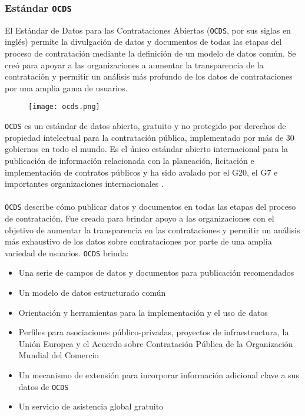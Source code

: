         \subsubsection{Estándar \texttt{OCDS}}
            El Estándar de Datos para las Contrataciones Abiertas (\texttt{OCDS}, por sus siglas en inglés) permite la divulgación de datos y documentos de todas las etapas del proceso de contratación mediante la definición de un modelo de datos común. Se creó para apoyar a las organizaciones a aumentar la transparencia de la contratación y permitir un análisis más profundo de los datos de contrataciones por una amplia gama de usuarios.
        
            \begin{figure}[h]
                \centering
                \texttt{[image: ocds.png]}
            \end{figure}
            
            \noindent \texttt{OCDS} es un estándar de datos abierto, gratuito y no protegido por derechos de propiedad intelectual para la contratación pública, implementado por más de 30 gobiernos en todo el mundo. Es el único estándar abierto internacional para la publicación de información relacionada con la planeación, licitación e implementación de contratos públicos y ha sido avalado por el G20, el G7 e importantes organizaciones internacionales \cite{OCDS}.
            \\ \\
            \texttt{OCDS} describe cómo publicar datos y documentos en todas las etapas del proceso de contratación. Fue creado para brindar apoyo a las organizaciones con el objetivo de aumentar la transparencia en las contrataciones y permitir un análisis más exhaustivo de los datos sobre contrataciones por parte de una amplia variedad de usuarios. \texttt{OCDS} brinda:
            
            \begin{itemize}
                \item Una serie de campos de datos y documentos para publicación recomendados
                \item Un modelo de datos estructurado común
                \item Orientación y herramientas para la implementación y el uso de datos
                \item Perfiles para asociaciones público-privadas, proyectos de infraestructura, la Unión Europea y el Acuerdo sobre Contratación Pública de la Organización Mundial del Comercio
                \item Un mecanismo de extensión para incorporar información adicional clave a sus datos de \texttt{OCDS}
                \item Un servicio de asistencia global gratuito
            \end{itemize}
            
